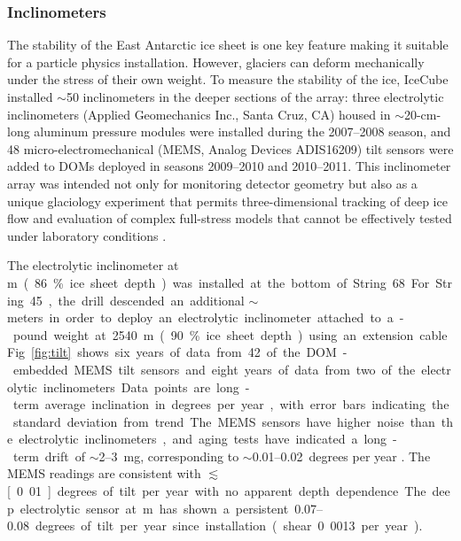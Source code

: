 \subsubsection{Inclinometers}

The stability of the East Antarctic ice sheet is one key feature making it
suitable for a particle physics installation.  However, glaciers can
deform mechanically under the stress of their own weight.  To measure the
stability of the ice, IceCube installed $\sim$50
inclinometers in the deeper sections of the array: three 
electrolytic inclinometers (Applied Geomechanics Inc., Santa Cruz, CA)
housed in $\sim$20-cm-long aluminum pressure modules were installed during
the 2007--2008 season, and 48 micro-electromechanical (MEMS, Analog Devices
ADIS16209) tilt sensors were added to DOMs deployed in seasons 2009--2010 and
2010--2011.  This inclinometer array was intended not only for monitoring
detector geometry but also as a unique glaciology experiment that
permits three-dimensional tracking of deep ice flow and evaluation of complex
full-stress models that cannot be effectively tested under laboratory
conditions \cite{pattyn03}.

The electrolytic inclinometer at \unit[2455]m (86\% ice sheet depth) was
installed at the bottom of String 68.  For String 45, the drill
descended an additional $\sim$\unit[100]meters in order to deploy an
electrolytic inclinometer attached to a \unit[100]-pound weight at 2540 m
(90\% ice sheet depth) using an extension cable.  Fig.~\ref{fig:tilt} shows
six years of data from 42 of the DOM-embedded MEMS tilt sensors and
eight years of data from two of the electrolytic inclinometers.  Data
points are long-term average inclination in degrees per year, with error
bars indicating the standard deviation from trend.  The MEMS sensors have
higher noise than the electrolytic inclinometers, and aging tests have indicated a long-term
drift of $\sim$\numrange[range-phrase = --]{2}{3}~mg, corresponding to
$\sim$\numrange[range-phrase = --]{0.01}{0.02}~degrees per year
\cite{inclinometer_comm}. The MEMS readings are consistent with
$\lesssim$\unit[0.01]degrees of tilt per year with no apparent depth
dependence.  The deep electrolytic sensor 
at \unit[2540]m has shown a persistent \numrange[range-phrase =
  --]{0.07}{0.08} degrees of tilt per year since installation (shear 0.0013
per year).

